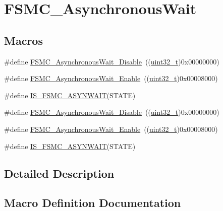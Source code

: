 \hypertarget{group___f_s_m_c___asynchronous_wait}{}\section{F\+S\+M\+C\+\_\+\+Asynchronous\+Wait}
\label{group___f_s_m_c___asynchronous_wait}
\subsection*{Macros}
\begin{DoxyCompactItemize}
\item 
\#define \hyperlink{group___f_s_m_c___asynchronous_wait_ga36c0dad6fe6c0e01632d3312c8f4c4cb}{F\+S\+M\+C\+\_\+\+Asynchronous\+Wait\+\_\+\+Disable}~((\hyperlink{_p_e___types_8h_a33594304e786b158f3fb30289278f5af}{uint32\+\_\+t})0x00000000)
\item 
\#define \hyperlink{group___f_s_m_c___asynchronous_wait_gaff524bfa697106ede7d4b557a5ad7d8c}{F\+S\+M\+C\+\_\+\+Asynchronous\+Wait\+\_\+\+Enable}~((\hyperlink{_p_e___types_8h_a33594304e786b158f3fb30289278f5af}{uint32\+\_\+t})0x00008000)
\item 
\#define \hyperlink{group___f_s_m_c___asynchronous_wait_ga52d579de825316ee058baf11bfb749d6}{I\+S\+\_\+\+F\+S\+M\+C\+\_\+\+A\+S\+Y\+N\+W\+A\+IT}(S\+T\+A\+TE)
\item 
\#define \hyperlink{group___f_s_m_c___asynchronous_wait_ga36c0dad6fe6c0e01632d3312c8f4c4cb}{F\+S\+M\+C\+\_\+\+Asynchronous\+Wait\+\_\+\+Disable}~((\hyperlink{_p_e___types_8h_a33594304e786b158f3fb30289278f5af}{uint32\+\_\+t})0x00000000)
\item 
\#define \hyperlink{group___f_s_m_c___asynchronous_wait_gaff524bfa697106ede7d4b557a5ad7d8c}{F\+S\+M\+C\+\_\+\+Asynchronous\+Wait\+\_\+\+Enable}~((\hyperlink{_p_e___types_8h_a33594304e786b158f3fb30289278f5af}{uint32\+\_\+t})0x00008000)
\item 
\#define \hyperlink{group___f_s_m_c___asynchronous_wait_ga52d579de825316ee058baf11bfb749d6}{I\+S\+\_\+\+F\+S\+M\+C\+\_\+\+A\+S\+Y\+N\+W\+A\+IT}(S\+T\+A\+TE)
\end{DoxyCompactItemize}


\subsection{Detailed Description}


\subsection{Macro Definition Documentation}
